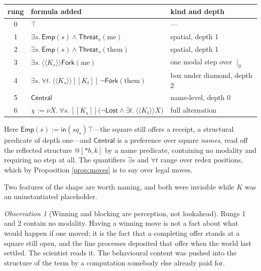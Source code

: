 \documentclass[11pt]{article}
\theoremstyle{definition}
\theoremstyle{plain}
\theoremstyle{remark}
\newtheorem{observation}[definition]{Observation}
\newcommand{\Thr}{\mathsf{Threat}}
\newcommand{\Frk}{\mathsf{Fork}}
\newcommand{\Ctr}{\mathsf{Central}}
\newcommand{\lin}{\mathsf{in}}
\begin{document}
\begin{center}
\begin{tabular}{@{}cll@{}}
\toprule
rung & formula added & kind and depth \\
\midrule
0 & $\top$ & --- \\[3pt]
1 & $\exists s.\ \mathsf{Emp}(s) \wedge \Thr_s(\text{me})$
  & spatial, depth 1 \\[3pt]
2 & $\exists s.\ \mathsf{Emp}(s) \wedge \Thr_s(\text{them})$
  & spatial, depth 1 \\[3pt]
3 & $\exists s.\ \langle\!\langle K_s\rangle\!\rangle \Frk(\text{me})$
  & one modal step over $\mid_0$ \\[3pt]
4 & $\exists s.\ \forall t.\ \langle\!\langle K_s\rangle\!\rangle
    [\![K_t]\!]\, \neg\Frk(\text{them})$
  & box under diamond, depth 2 \\[3pt]
5 & $\Ctr$ & name-level, depth 0 \\[3pt]
6 & $\chi := \nu X.\ \forall s.\, [\![K_s]\!]\big(\neg\mathsf{Lost} \wedge
    \exists t.\ \langle\!\langle K_t\rangle\!\rangle X\big)$
  & full alternation \\
\bottomrule
\end{tabular}
\end{center}

Here $\mathsf{Emp}(s) := \lin(\mathit{sq}_s)\top$---the square still offers a
receipt, a structural predicate of depth one---and $\Ctr$ is a preference over
square \emph{names}, read off the reflected structure $@[*b,k]$ by a name
predicate, containing no modality and requiring no step at all. The quantifiers
$\exists s$ and $\forall t$ range over redex positions, which by Proposition
\ref{prop:moves} is to say over legal moves.

Two features of the shape are worth naming, and both were invisible while $K$
was an uninstantiated placeholder.

\begin{observation}[Winning and blocking are perception, not lookahead]
Rungs 1 and 2 contain no modality. Having a winning move is not a fact about
what would happen if one moved; it is the fact that a completing offer stands at
a square still open, and the line processes deposited that offer when the world
last settled. The scientist reads it. The behavioural content was pushed into
the structure of the term by a computation somebody else already paid for.
\end{observation}
\end{document}
